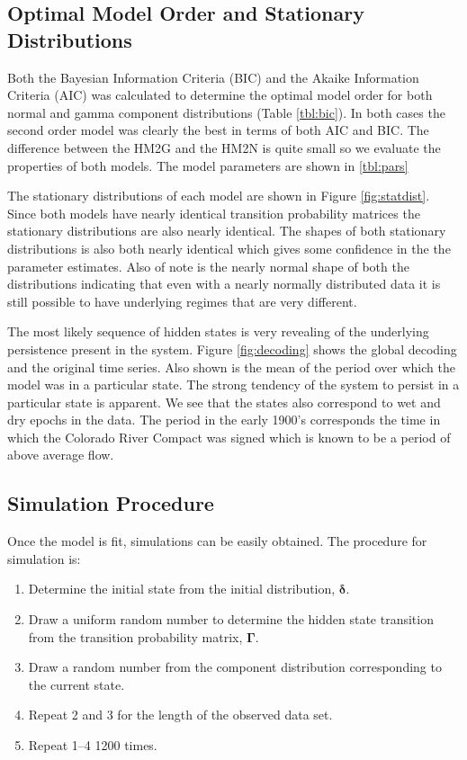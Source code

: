 \documentclass[wrr]{AGUTeX}
\begin{document}
\begin{article}
\subsection{Optimal Model Order and Stationary Distributions}
Both the Bayesian Information Criteria (BIC) \citep{Schwarz:1978uv} and the Akaike Information Criteria (AIC) \citep{Akaike:1974ih} was calculated to determine the optimal model order for both normal and gamma component distributions (Table \ref{tbl:bic}).  In both cases the second order model was clearly the best in terms of both AIC and BIC. The difference between the HM2G and the HM2N is quite small so we evaluate the properties of both models.  The model parameters are shown in \ref{tbl:pars}

The stationary distributions of each model are shown in Figure \ref{fig:statdist}. Since both models have nearly identical transition probability matrices the stationary distributions are also nearly identical. The shapes of both stationary distributions is also both nearly identical which gives some confidence in the the parameter estimates.  Also of note is the nearly normal shape of both the distributions indicating that even with a nearly normally distributed data it is still possible to have underlying regimes that are very different. 

The most likely sequence of hidden states is very revealing of the underlying persistence present in the system. Figure \ref{fig:decoding} shows the global decoding and the original time series.  Also shown is the mean of the period over which the model was in a particular state. The strong tendency of the system to persist in a particular state is apparent.  We see that the states also correspond to wet and dry epochs in the data.  The period in the early 1900's corresponds the time in which the Colorado River Compact was signed which is known to be a period of above average flow. 

\subsection{Simulation Procedure}

Once the model is fit, simulations can be easily obtained. The procedure for simulation is:
\begin{enumerate}
\item Determine the initial state from the initial distribution, $\boldsymbol\delta$.
\item Draw a uniform random number to determine the hidden state transition from the transition probability matrix, $\boldsymbol\Gamma$.
\item Draw a random number from the component distribution corresponding to the current state. 
\item Repeat 2 and 3 for the length of the observed data set. 
\item Repeat 1--4 1200 times.
\end{enumerate}



\end{article}
\end{document}
